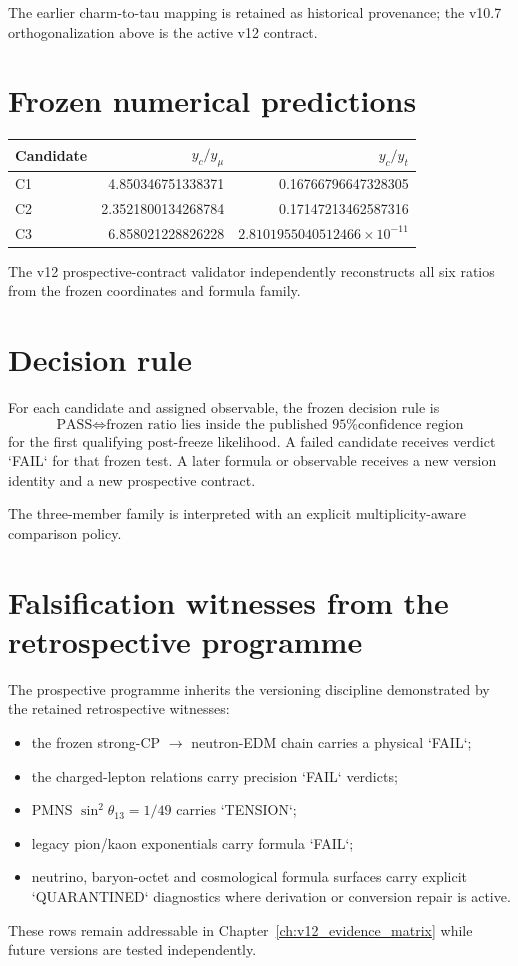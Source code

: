 The earlier charm-to-tau mapping is retained as historical provenance; the v10.7 orthogonalization above is the active v12 contract.

\section{Frozen numerical predictions}

\begin{center}
\begin{tabular}{lrr}
\toprule
Candidate & $y_c/y_\mu$ & $y_c/y_t$\\
\midrule
C1 & 4.850346751338371 & 0.16766796647328305\\
C2 & 2.3521800134268784 & 0.17147213462587316\\
C3 & 6.858021228826228 & $2.8101955040512466\times10^{-11}$\\
\bottomrule
\end{tabular}
\end{center}

The v12 prospective-contract validator independently reconstructs all six ratios from the frozen coordinates and formula family.

\section{Decision rule}

For each candidate and assigned observable, the frozen decision rule is
\begin{equation}
\boxed{
\text{PASS}
\iff
\text{frozen ratio lies inside the published 95\% confidence region}
}
\end{equation}
for the first qualifying post-freeze likelihood. A failed candidate receives verdict `FAIL` for that frozen test. A later formula or observable receives a new version identity and a new prospective contract.

The three-member family is interpreted with an explicit multiplicity-aware comparison policy.

\section{Falsification witnesses from the retrospective programme}

The prospective programme inherits the versioning discipline demonstrated by the retained retrospective witnesses:
\begin{itemize}
\item the frozen strong-CP $\to$ neutron-EDM chain carries a physical `FAIL`;
\item the charged-lepton relations carry precision `FAIL` verdicts;
\item PMNS $\sin^2\theta_{13}=1/49$ carries `TENSION`;
\item legacy pion/kaon exponentials carry formula `FAIL`;
\item neutrino, baryon-octet and cosmological formula surfaces carry explicit `QUARANTINED` diagnostics where derivation or conversion repair is active.
\end{itemize}
These rows remain addressable in Chapter~\ref{ch:v12_evidence_matrix} while future versions are tested independently.

